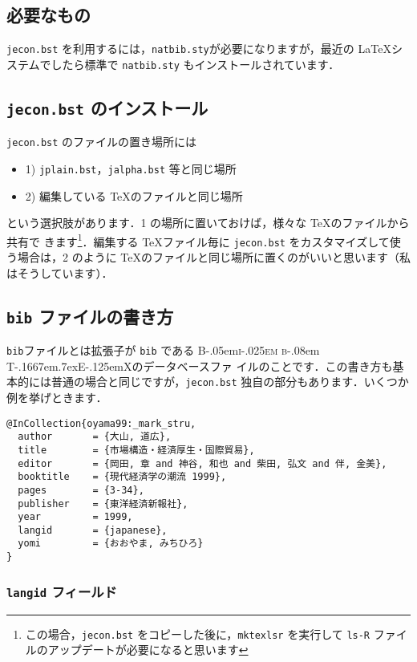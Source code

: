 \documentclass[article]{jlreq}
\newcommand{\BibTeX}{\textrm{B\kern-.05em\textsc{i\kern-.025em b}\kern-.08em%
T\kern-.1667em\lower.7ex\hbox{E}\kern-.125emX}}
\begin{document}
\subsection{必要なもの}

\texttt{jecon.bst} を利用するには，\texttt{natbib.sty}が必要になりますが，最近の
\LaTeX システムでしたら標準で \texttt{natbib.sty} もインストールされています．


\subsection{\texttt{jecon.bst} のインストール}

\texttt{jecon.bst} のファイルの置き場所には
\begin{itemize}
 \item 1) \texttt{jplain.bst}，\texttt{jalpha.bst} 等と同じ場所
 \item 2) 編集している \TeX のファイルと同じ場所
\end{itemize}
という選択肢があります．1 の場所に置いておけば，様々な \TeX のファイルから共有で
きます\footnote{この場合，\texttt{jecon.bst} をコピーした後に，\texttt{mktexlsr}
を実行して \texttt{ls-R} ファイルのアップデートが必要になると思います}．編集する
\TeX ファイル毎に \texttt{jecon.bst} をカスタマイズして使う場合は，2 のように
\TeX のファイルと同じ場所に置くのがいいと思います（私はそうしています）．

\subsection{\texttt{bib} ファイルの書き方}

\texttt{bib}ファイルとは拡張子が \texttt{bib} である \BibTeX のデータベースファ
イルのことです．この書き方も基本的には普通の場合と同じですが，\texttt{jecon.bst}
独自の部分もあります．いくつか例を挙げときます．

\begin{screen}
\begin{verbatim}
@InCollection{oyama99:_mark_stru,
  author       = {大山, 道広},
  title        = {市場構造・経済厚生・国際貿易},
  editor       = {岡田, 章 and 神谷, 和也 and 柴田, 弘文 and 伴, 金美},
  booktitle    = {現代経済学の潮流 1999},
  pages        = {3-34},
  publisher    = {東洋経済新報社},
  year         = 1999,
  langid       = {japanese},
  yomi         = {おおやま, みちひろ}
}
\end{verbatim}
\end{screen}

\subsubsection{\texttt{langid} フィールド}
\label{jecon-example-sec:langid}
\end{document}

